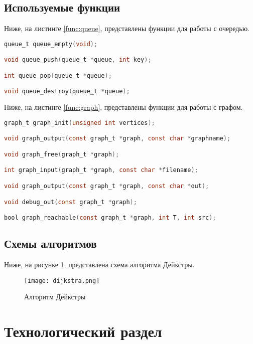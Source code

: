 \section{Используемые функции}

Ниже, на листинге \ref{func:queue}, представлены функции для работы с очередью.

\begin{lstlisting}[language=C,caption=Функции для работы с очередью,label=func:queue]
queue_t queue_empty(void);

void queue_push(queue_t *queue, int key);

int queue_pop(queue_t *queue);

void queue_destroy(queue_t *queue);
\end{lstlisting}

Ниже, на листинге \ref{func:graph}, представлены функции для работы с графом.

\begin{lstlisting}[language=C,caption=Функции для работы с графом,label=func:graph]
graph_t graph_init(unsigned int vertices);

void graph_output(const graph_t *graph, const char *graphname);

void graph_free(graph_t *graph);

int graph_input(graph_t *graph, const char *filename);

void graph_output(const graph_t *graph, const char *out);

void debug_out(const graph_t *graph);

bool graph_reachable(const graph_t *graph, int T, int src);
\end{lstlisting}

\section{Схемы алгоритмов}

Ниже, на рисунке \ref{algo}, представлена схема алгоритма Дейкстры.

\begin{figure}[h]
    \centering
    \texttt{[image: dijkstra.png]}
    \caption{Алгоритм Дейкстры}
    \label{algo}
\end{figure}

\chapter{Технологический раздел}

